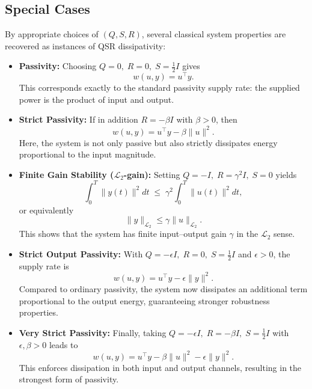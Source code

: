 \subsection{Special Cases}
By appropriate choices of $(Q,S,R)$, several classical system properties are recovered as instances of QSR dissipativity:

\begin{itemize}
    \item \textbf{Passivity:}  
    Choosing $Q=0,\;R=0,\;S=\tfrac{1}{2}I$ gives
    \begin{equation}
        w(u,y) = u^\top y.
    \end{equation}
    This corresponds exactly to the standard passivity supply rate: the supplied power is 
    the product of input and output.

    \item \textbf{Strict Passivity:}  
    If in addition $R=-\beta I$ with $\beta>0$, then
    \begin{equation}
        w(u,y) = u^\top y - \beta \|u\|^2.
    \end{equation}
    Here, the system is not only passive but also strictly dissipates energy 
    proportional to the input magnitude.

    \item \textbf{Finite Gain Stability ($\mathcal{L}_2$-gain):}  
    Setting $Q=-I,\; R=\gamma^2 I,\; S=0$ yields
    \begin{equation}
        \int_0^T \|y(t)\|^2 dt \;\le\; \gamma^2 \int_0^T \|u(t)\|^2 dt,
    \end{equation}
    or equivalently
    \begin{equation}
        \|y\|_{\mathcal{L}_2} \le \gamma \|u\|_{\mathcal{L}_2}.
    \end{equation}
    This shows that the system has finite input–output gain $\gamma$ in the 
    $\mathcal{L}_2$ sense.

    \item \textbf{Strict Output Passivity:}  
    With $Q=-\epsilon I,\; R=0,\; S=\tfrac{1}{2}I$ and $\epsilon>0$, the supply rate is
    \begin{equation}
        w(u,y) = u^\top y - \epsilon \|y\|^2.
    \end{equation}
    Compared to ordinary passivity, the system now dissipates an additional term proportional 
    to the output energy, guaranteeing stronger robustness properties.

    \item \textbf{Very Strict Passivity:}  
    Finally, taking $Q=-\epsilon I,\; R=-\beta I,\; S=\tfrac{1}{2}I$ with $\epsilon,\beta>0$ leads to
    \begin{equation}
        w(u,y) = u^\top y - \beta \|u\|^2 - \epsilon \|y\|^2.
    \end{equation}
    This enforces dissipation in both input and output channels, resulting in the strongest 
    form of passivity.
\end{itemize}

